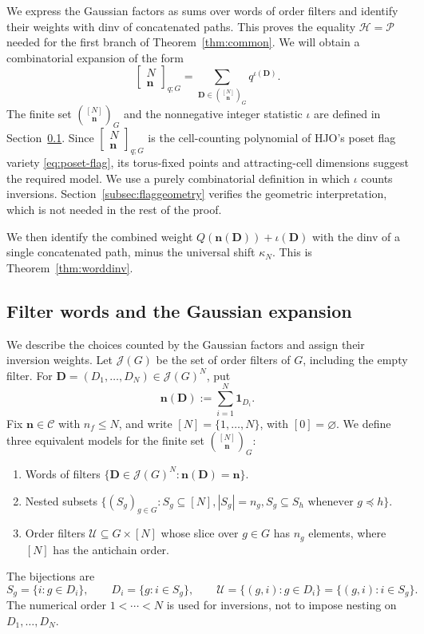 \documentclass[12pt,reqno]{amsart}
\numberwithin{equation}{section}
\theoremstyle{definition}
\theoremstyle{remark}
\theoremstyle{plain}
\newcommand{\one}{\mathbf1}
\newcommand{\nn}{\mathbf n}
\newcommand{\mult}[2]{\left[\begin{matrix}#1\\#2\end{matrix}\right]_{q;G}}
\newcommand{\Hseries}{\mathscr H}
\newcommand{\Pseries}{\mathscr P}
\begin{document}
We express the Gaussian factors as sums over words of order filters and
identify their weights with dinv of concatenated paths.  This proves the
equality $\Hseries=\Pseries$ needed for the first branch of
Theorem~\ref{thm:common}.
We will obtain a combinatorial expansion of the form
\[
 \mult N\nn=\sum_{\boldsymbol D\in\binom{[N]}{\nn}_G}
                         q^{\iota(\boldsymbol D)}.
\]
The finite set $\binom{[N]}{\nn}_G$ and the nonnegative integer statistic
$\iota$ are defined in Section~\ref{subsec:filterwords}.
Since $\mult N\nn$ is the cell-counting polynomial of HJO's poset flag
variety \eqref{eq:poset-flag}, its torus-fixed points and attracting-cell
dimensions suggest the required model.  We use a purely combinatorial
definition in which $\iota$ counts inversions.
Section~\ref{subsec:flaggeometry} verifies the geometric interpretation,
which is not needed in the rest of the proof.

We then identify the combined weight
$Q(\nn(\boldsymbol D))+\iota(\boldsymbol D)$ with the dinv of a single
concatenated path, minus the universal shift $\kappa_N$.  This is Theorem~\ref{thm:worddinv}.

\subsection{Filter words and the Gaussian expansion}\label{subsec:filterwords}
We describe the choices counted by the Gaussian factors and assign their
inversion weights.  Let $\mathcal J(G)$ be the set of order filters of $G$, including the
empty filter.  For $\boldsymbol D=(D_1,\ldots,D_N)\in\mathcal J(G)^N$, put
\begin{equation}\label{eq:wordset}
 \nn(\boldsymbol D):=\sum_{i=1}^N\one_{D_i}.
\end{equation}
Fix $\nn\in\mathcal C$ with $n_f\le N$, and write
$[N]=\{1,\ldots,N\}$, with $[0]=\varnothing$.
We define three equivalent models for the finite set $\binom{[N]}{\nn}_{G}$:
\begin{enumerate}
 \item Words of filters $\{\boldsymbol D\in\mathcal J(G)^N:\nn(\boldsymbol D)=\nn\}$.
 \item Nested subsets $\{(S_g)_{g\in G}:S_g\subseteq[N], |S_g|=n_g, S_g\subseteq S_h\text{ whenever }g\preceq h\}$.
 \item Order filters $\mathcal U\subseteq G\times[N]$ whose slice
       over $g\in G$ has $n_g$ elements, where $[N]$ has the antichain order.
\end{enumerate}
The bijections are
\begin{equation}\label{eq:setslices}
 S_g=\{i:g\in D_i\},\qquad
 D_i=\{g:i\in S_g\},\qquad
 \mathcal U=\{(g,i):g\in D_i\}=\{(g,i):i\in S_g\}.
\end{equation}
The numerical order $1<\cdots<N$ is used for inversions, not to impose
nesting on $D_1,\ldots,D_N$.   
\end{document}
